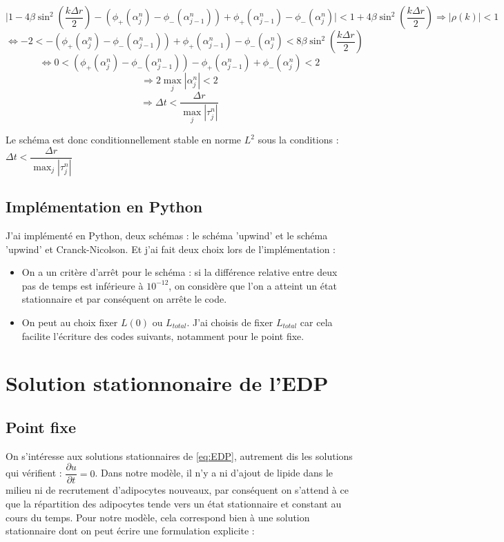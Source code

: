 \documentclass[a4paper,fleqn,leqno]{article}
\begin{document}
\[\lvert 1 - 4\beta\sin^2(\dfrac{k\Delta r}{2}) -(\phi_+(\alpha^n_j)- \phi_-(\alpha^n_{j-1})) + \phi_+(\alpha^n_{j-1})- \phi_-(\alpha^n_j)\rvert <  1 + 4\beta\sin^2(\dfrac{k\Delta r}{2}) \Rightarrow \lvert\rho(k)\rvert < 1\]
\[\Leftrightarrow -2 < -(\phi_+(\alpha^n_j)- \phi_-(\alpha^n_{j-1})) + \phi_+(\alpha^n_{j-1})- \phi_-(\alpha^n_j)< 8\beta\sin^2(\dfrac{k\Delta r}{2})\]
\[\Leftrightarrow 0 < (\phi_+(\alpha^n_j)- \phi_-(\alpha^n_{j-1})) -\phi_+(\alpha^n_{j-1})+  \phi_-(\alpha^n_j) < 2\]
\[\Rightarrow 2\max_j|\alpha^n_j| < 2\]
\[\Rightarrow \Delta t < \dfrac{\Delta r}{\max_j|\tau^n_j|}\]

Le schéma est donc conditionnellement stable en norme $L^2$ sous la conditions : $\Delta t < \dfrac{\Delta r}{\max_j|\tau^n_j|}$


\subsection{Implémentation en Python}

J'ai implémenté en Python, deux schémas : le schéma 'upwind' et le schéma 'upwind' et Cranck-Nicolson. Et j'ai fait deux choix lors de l'implémentation :
\begin{itemize}
\item On a un critère d'arrêt pour le schéma : si la différence relative entre deux pas de temps est inférieure à $10^{-12}$, on considère que l'on a atteint un état stationnaire et par conséquent on arrête le code.
\item On peut au choix fixer $L(0)$ ou $L_{total}$. J'ai choisis de fixer $L_{total}$ car cela facilite l'écriture des codes suivants, notamment pour le point fixe.
\end{itemize}


\section{Solution stationnonaire de l'EDP}

\subsection{Point fixe}

On s'intéresse aux solutions stationnaires de \eqref{eq:EDP}, autrement dis les solutions qui vérifient : $\dfrac{\partial u}{\partial t} = 0$. Dans notre modèle, il n'y a ni d'ajout de lipide dans le milieu ni de recrutement d'adipocytes nouveaux, par conséquent on s'attend à ce que la répartition des adipocytes tende vers un état stationnaire et constant au cours du temps. Pour notre modèle, cela correspond bien à une solution stationnaire dont on peut écrire une formulation explicite :
\end{document}
